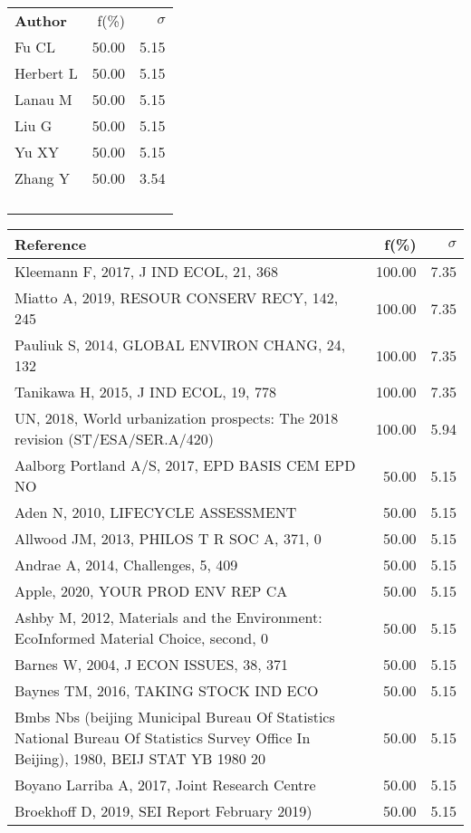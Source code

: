 \documentclass[a4paper,11pt]{report}
\begin{document}
\begin{landscape}
\begin{table}[!ht]
{\begin{tabular}{|p{5cm} r r|}
 &  & \\
\hline
{\bf Author }& f(\%) & $\sigma$\\
\hline
Fu CL & 50.00 & 5.15\\
Herbert L & 50.00 & 5.15\\
Lanau M & 50.00 & 5.15\\
Liu G & 50.00 & 5.15\\
Yu XY & 50.00 & 5.15\\
Zhang Y & 50.00 & 3.54\\
 &  & \\
 &  & \\
 &  & \\
 &  & \\
\hline
\end{tabular}
}
{\scriptsize\begin{tabular}{|p{8cm} r r|}
\hline
{\bf Reference }& f(\%) & $\sigma$\\
\hline
Kleemann F, 2017, J IND ECOL, 21, 368 & 100.00 & 7.35\\
Miatto A, 2019, RESOUR CONSERV RECY, 142, 245 & 100.00 & 7.35\\
Pauliuk S, 2014, GLOBAL ENVIRON CHANG, 24, 132 & 100.00 & 7.35\\
Tanikawa H, 2015, J IND ECOL, 19, 778 & 100.00 & 7.35\\
UN, 2018, World urbanization prospects: The 2018 revision (ST/ESA/SER.A/420) & 100.00 & 5.94\\
Aalborg Portland A/S, 2017, EPD BASIS CEM EPD NO & 50.00 & 5.15\\
Aden N, 2010, LIFECYCLE ASSESSMENT & 50.00 & 5.15\\
Allwood JM, 2013, PHILOS T R SOC A, 371, 0 & 50.00 & 5.15\\
Andrae A, 2014, Challenges, 5, 409 & 50.00 & 5.15\\
Apple, 2020, YOUR PROD ENV REP CA & 50.00 & 5.15\\
Ashby M, 2012, Materials and the Environment: EcoInformed Material Choice, second, 0 & 50.00 & 5.15\\
Barnes W, 2004, J ECON ISSUES, 38, 371 & 50.00 & 5.15\\
Baynes TM, 2016, TAKING STOCK IND ECO & 50.00 & 5.15\\
Bmbs Nbs (beijing Municipal Bureau Of Statistics National Bureau Of Statistics Survey Office In Beijing), 1980, BEIJ STAT YB 1980 20 & 50.00 & 5.15\\
Boyano Larriba A, 2017, Joint Research Centre & 50.00 & 5.15\\
Broekhoff D, 2019, SEI Report February 2019) & 50.00 & 5.15\\

\end{tabular}}
\end{table}
\end{landscape}
\end{document}
